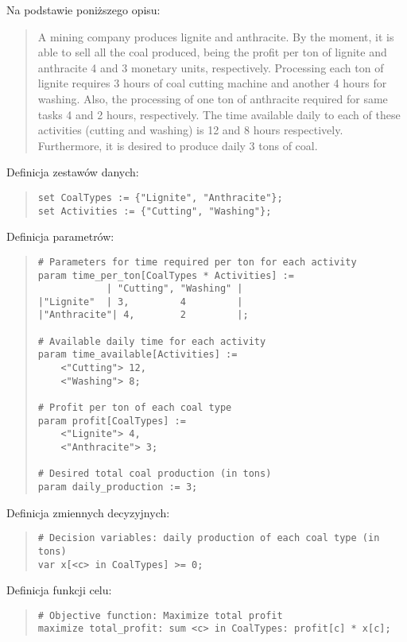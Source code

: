 Na podstawie poniższego opisu:
\begin{quote}
    A mining company produces lignite and anthracite. By the moment, it is able to sell all the coal produced, being the profit per ton of lignite and anthracite 4 and 3 monetary units, respectively. Processing each ton of lignite requires 3 hours of coal cutting machine and another 4 hours for washing. Also, the processing of one ton of anthracite required for same tasks 4 and 2 hours, respectively. The time available daily to each of these activities (cutting and washing) is 12 and 8 hours respectively. Furthermore, it is desired to produce daily 3 tons of coal.
\end{quote}

Definicja zestawów danych:
\begin{quote}
\begin{verbatim}
set CoalTypes := {"Lignite", "Anthracite"};
set Activities := {"Cutting", "Washing"};
\end{verbatim}
\end{quote}

Definicja parametrów:
\begin{quote}
\begin{verbatim}
# Parameters for time required per ton for each activity
param time_per_ton[CoalTypes * Activities] :=
            | "Cutting", "Washing" |
|"Lignite"  | 3,         4         |
|"Anthracite"| 4,        2         |;

# Available daily time for each activity
param time_available[Activities] :=
    <"Cutting"> 12,
    <"Washing"> 8;

# Profit per ton of each coal type
param profit[CoalTypes] :=
    <"Lignite"> 4,
    <"Anthracite"> 3;

# Desired total coal production (in tons)
param daily_production := 3;
\end{verbatim}
\end{quote}

Definicja zmiennych decyzyjnych:
\begin{quote}
\begin{verbatim}
# Decision variables: daily production of each coal type (in tons)
var x[<c> in CoalTypes] >= 0;
\end{verbatim}
\end{quote}

Definicja funkcji celu:
\begin{quote}
\begin{verbatim}
# Objective function: Maximize total profit
maximize total_profit: sum <c> in CoalTypes: profit[c] * x[c];

\end{verbatim}
\end{quote}

